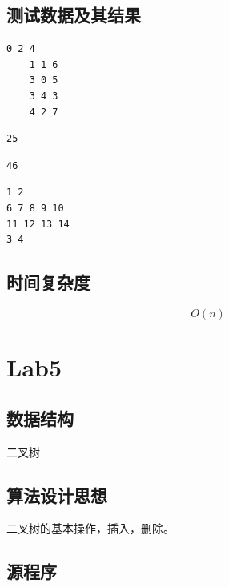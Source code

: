 \documentclass[a4paper,11pt,UTF8]{ctexart}
\begin{document}
\subsection{测试数据及其结果}

\begin{lstlisting}[caption=1triple.cpp,captionpos=b]
    0 2 4
    1 1 6
    3 0 5
    3 4 3
    4 2 7
\end{lstlisting}

\begin{lstlisting}[caption=2Saddle\_point.cpp,captionpos=b]
    25
\end{lstlisting}

\begin{lstlisting}[caption=3CSP.cpp,captionpos=b]
    46
\end{lstlisting}
\begin{lstlisting}[caption=4CSP.cpp,captionpos=b]
1 2
6 7 8 9 10
11 12 13 14
3 4
\end{lstlisting}







\subsection{时间复杂度}
$$O(n)$$


\section{Lab5}
\subsection{数据结构}
二叉树
\subsection{算法设计思想}
二叉树的基本操作，插入，删除。
\subsection{源程序}







\end{document}
